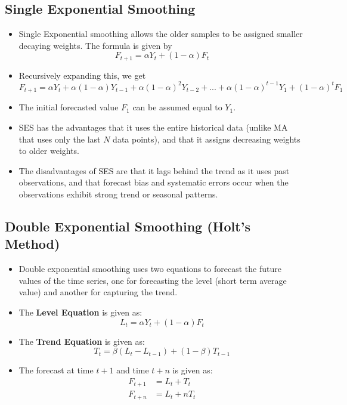 \documentclass{article}
\theoremstyle{plain}
\theoremstyle{definition}
\begin{document}
\subsection{Single Exponential Smoothing}
\begin{itemize}
    \item Single Exponential smoothing allows the older samples to be assigned smaller decaying weights. The formula is given by
    \begin{equation}
        F_{t+1} = \alpha Y_t + (1-\alpha) F_t
    \end{equation}
    
    \item Recursively expanding this, we get
    \begin{equation*}
        F_{t+1} = \alpha Y_t + \alpha(1-\alpha) Y_{t-1} +  \alpha(1-\alpha)^2 Y_{t-2} + ... + \alpha(1-\alpha)^{t-1} Y_{1} + (1-\alpha)^t F_1
    \end{equation*}
    
    \item The initial forecasted value $F_1$ can be assumed equal to $Y_1$. 
    
    \item SES has the advantages that it uses the entire historical data (unlike MA that uses only the last $N$ data points), and that it assigns decreasing weights to older weights.
    
    \item The disadvantages of SES are that it lags behind the trend as it uses past observations, and that forecast bias and systematic errors occur when the observations exhibit strong trend or seasonal patterns.
\end{itemize}

\subsection{Double Exponential Smoothing (Holt's Method)}
\begin{itemize}
    \item Double exponential smoothing uses two equations to forecast the future values of the time series, one for forecasting the level (short term average value) and another for capturing the trend.
    
    \item The \textbf{Level Equation} is given as:
    \begin{equation}
        L_t = \alpha Y_t + (1-\alpha)F_t
    \end{equation}
    
    \item The \textbf{Trend Equation} is given as:
    \begin{equation}
        T_t = \beta (L_t - L_{t-1}) + (1 - \beta)T_{t-1}
    \end{equation}
    
    \item The forecast at time $t+1$ and time $t+n$ is given as:
    \begin{align*}
        F_{t+1} &= L_t + T_t\\
        F_{t+n} &= L_t + nT_t
    \end{align*}
\end{itemize}
\end{document}
